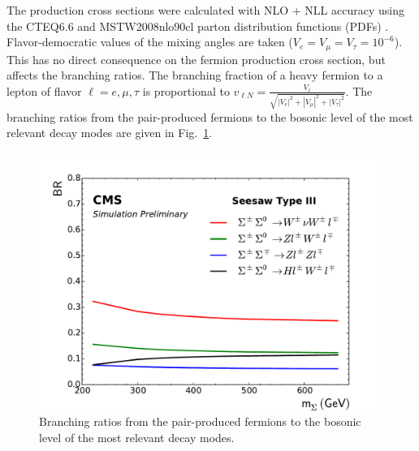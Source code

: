 The production cross sections were calculated with NLO + NLL accuracy using the CTEQ6.6 and MSTW2008nlo90cl parton distribution functions (PDFs) \cite{Fuks:2012qx,Fuks:2013vua}. Flavor-democratic values of the mixing angles are taken ($V_e = V_\mu = V_\tau = 10^{-6}$). This has no direct consequence on the fermion production cross section, but affects the branching ratios. The branching fraction of a heavy fermion to a lepton of flavor $\ell = e, \mu, \tau$ is proportional to $v_{\ell N} = \frac{V_\ell}{\sqrt{|V_e|^2 + |V_\mu|^2 + |V_\tau|^2}}$. The branching ratios from the pair-produced fermions to the bosonic level of the most relevant decay modes are given in Fig.~\ref{fig:SeesawBR}.

\begin{figure}
\begin{center}
	\includegraphics[width=.8\textwidth]{Theory/BR}
	\caption{Branching ratios from the pair-produced fermions to the bosonic level of the most relevant decay modes.
	\label{fig:SeesawBR}}
\end{center}
\end{figure}
